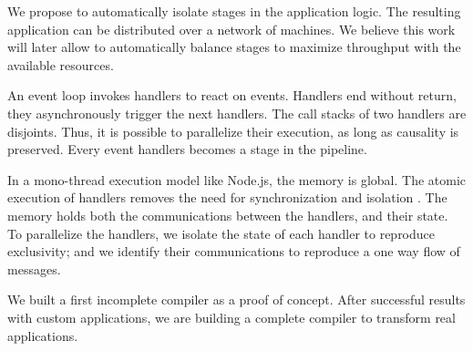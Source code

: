 We propose to automatically isolate stages in the application logic.
The resulting application can be distributed over a network of machines.
We believe this work will later allow to automatically balance stages to maximize throughput with the available resources.

An event loop invokes handlers to react on events.
Handlers end without return, they asynchronously trigger the next handlers.
The call stacks of two handlers are disjoints.
Thus, it is possible to parallelize their execution, as long as causality is preserved.
Every event handlers becomes a stage in the pipeline.

In a mono-thread execution model like Node.js, the memory is global.
The atomic execution of handlers removes the need for synchronization and isolation \cite{Adya2002}.
The memory holds both the communications between the handlers, and their state.
To parallelize the handlers, we isolate the state of each handler to reproduce exclusivity; and we identify their communications to reproduce a one way flow of messages.

We built a first incomplete compiler as a proof of concept.
After successful results with custom applications, we are building a complete compiler to transform real applications.







